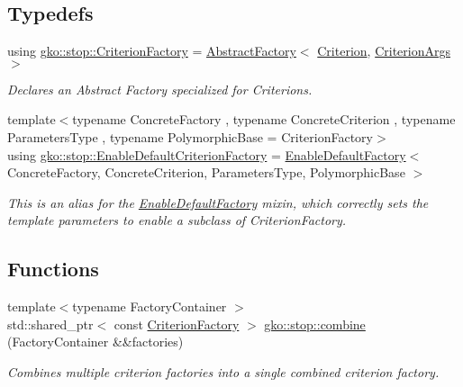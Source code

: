 \subsection*{Typedefs}
\begin{DoxyCompactItemize}
\item 
\mbox{\label{group__stop_gab12a51109c50b35ec36dc5a393d6a9a0}} 
using \hyperlink{group__stop_gab12a51109c50b35ec36dc5a393d6a9a0}{gko\+::stop\+::\+Criterion\+Factory} = \hyperlink{classgko_1_1AbstractFactory}{Abstract\+Factory}$<$ \hyperlink{classgko_1_1stop_1_1Criterion}{Criterion}, \hyperlink{structgko_1_1stop_1_1CriterionArgs}{Criterion\+Args} $>$
\begin{DoxyCompactList}\small\item\em Declares an Abstract Factory specialized for Criterions. \end{DoxyCompactList}\item 
{\footnotesize template$<$typename Concrete\+Factory , typename Concrete\+Criterion , typename Parameters\+Type , typename Polymorphic\+Base  = Criterion\+Factory$>$ }\\using \hyperlink{group__stop_gab045b6fd7571f3234d9a63a5ee5a2252}{gko\+::stop\+::\+Enable\+Default\+Criterion\+Factory} = \hyperlink{classgko_1_1EnableDefaultFactory}{Enable\+Default\+Factory}$<$ Concrete\+Factory, Concrete\+Criterion, Parameters\+Type, Polymorphic\+Base $>$
\begin{DoxyCompactList}\small\item\em This is an alias for the \hyperlink{classgko_1_1EnableDefaultFactory}{Enable\+Default\+Factory} mixin, which correctly sets the template parameters to enable a subclass of Criterion\+Factory. \end{DoxyCompactList}\end{DoxyCompactItemize}
\subsection*{Functions}
\begin{DoxyCompactItemize}
\item 
{\footnotesize template$<$typename Factory\+Container $>$ }\\std\+::shared\+\_\+ptr$<$ const \hyperlink{group__stop_gab12a51109c50b35ec36dc5a393d6a9a0}{Criterion\+Factory} $>$ \hyperlink{group__stop_ga3a3325b3a7660501f3bb72d08b09f2d2}{gko\+::stop\+::combine} (Factory\+Container \&\&factories)
\begin{DoxyCompactList}\small\item\em Combines multiple criterion factories into a single combined criterion factory. \end{DoxyCompactList}\end{DoxyCompactItemize}


